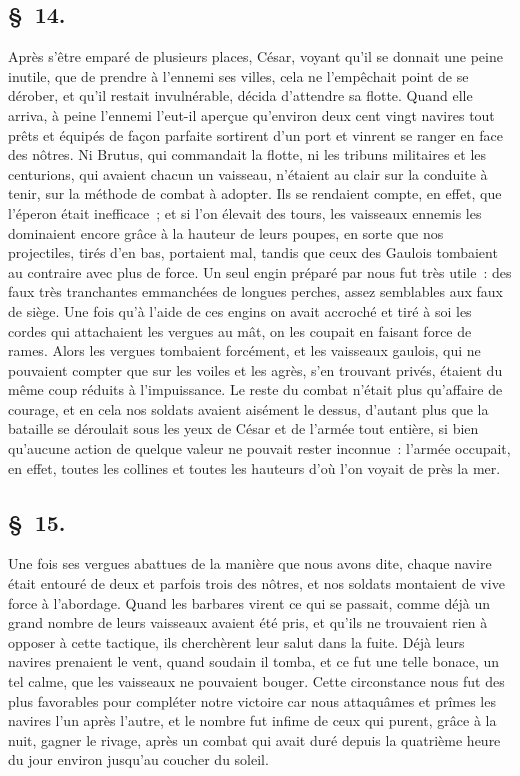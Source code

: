 \documentclass[french,twoside]{book} %
\begin{document}
\subsection[{§ 14.}]{ \textsc{§ 14.} }
\noindent Après s’être emparé de plusieurs places, César, voyant qu’il se donnait une peine inutile, que de prendre à l’ennemi ses villes, cela ne l’empêchait point de se dérober, et qu’il restait invulnérable, décida d’attendre sa flotte. Quand elle arriva, à peine l’ennemi l’eut-il aperçue qu’environ deux cent vingt navires tout prêts et équipés de façon parfaite sortirent d’un port et vinrent se ranger en face des nôtres. Ni Brutus, qui commandait la flotte, ni les tribuns militaires et les centurions, qui avaient chacun un vaisseau, n’étaient au clair sur la conduite à tenir, sur la méthode de combat à adopter. Ils se rendaient compte, en effet, que l’éperon était inefficace ; et si l’on élevait des tours, les vaisseaux ennemis les dominaient encore grâce à la hauteur de leurs poupes, en sorte que nos projectiles, tirés d’en bas, portaient mal, tandis que ceux des Gaulois tombaient au contraire avec plus de force. Un seul engin préparé par nous fut très utile : des faux très tranchantes emmanchées de longues perches, assez semblables aux faux de siège. Une fois qu’à l’aide de ces engins on avait accroché et tiré à soi les cordes qui attachaient les vergues au mât, on les coupait en faisant force de rames. Alors les vergues tombaient forcément, et les vaisseaux gaulois, qui ne pouvaient compter que sur les voiles et les agrès, s’en trouvant privés, étaient du même coup réduits à l’impuissance. Le reste du combat n’était plus qu’affaire de courage, et en cela nos soldats avaient aisément le dessus, d’autant plus que la bataille se déroulait sous les yeux de César et de l’armée tout entière, si bien qu’aucune action de quelque valeur ne pouvait rester inconnue : l’armée occupait, en effet, toutes les collines et toutes les hauteurs d’où l’on voyait de près la mer.
\subsection[{§ 15.}]{ \textsc{§ 15.} }
\noindent Une fois ses vergues abattues de la manière que nous avons dite, chaque navire était entouré de deux et parfois trois des nôtres, et nos soldats montaient de vive force à l’abordage. Quand les barbares virent ce qui se passait, comme déjà un grand nombre de leurs vaisseaux avaient été pris, et qu’ils ne trouvaient rien à opposer à cette tactique, ils cherchèrent leur salut dans la fuite. Déjà leurs navires prenaient le vent, quand soudain il tomba, et ce fut une telle bonace, un tel calme, que les vaisseaux ne pouvaient bouger. Cette circonstance nous fut des plus favorables pour compléter notre victoire car nous attaquâmes et prîmes les navires l’un après l’autre, et le nombre fut infime de ceux qui purent, grâce à la nuit, gagner le rivage, après un combat qui avait duré depuis la quatrième heure du jour environ jusqu’au coucher du soleil.
\end{document}
